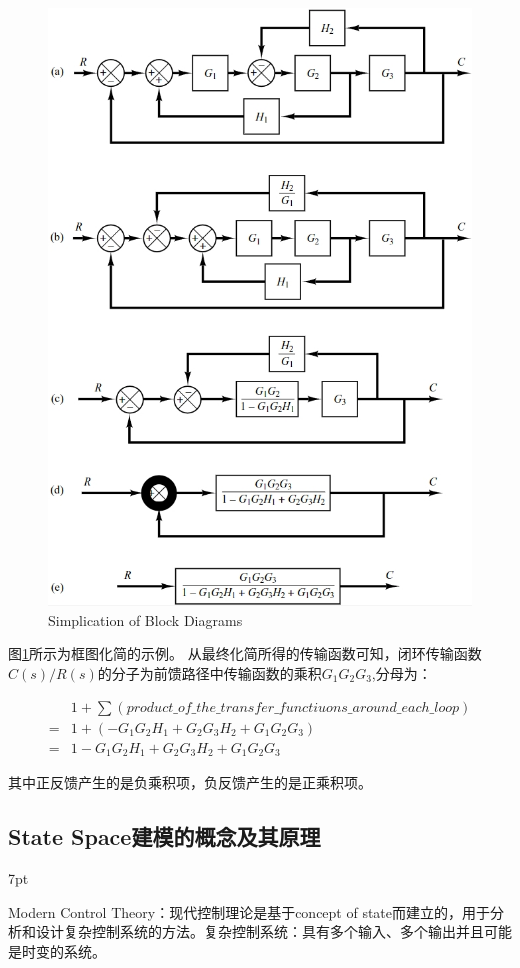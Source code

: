 \documentclass{article}
\numberwithin{equation}{section}
\numberwithin{figure}{section}
\newenvironment{formal}{%
\def\FrameCommand{%
\hspace{1pt}%
{\color{DarkBlue}\vrule width 2pt}%
{\color{formalshade}\vrule width 4pt}%
\colorbox{formalshade}%
}%
\MakeFramed{\advance\hsize-\width\FrameRestore}%
\noindent\hspace{-4.55pt}%
\begin{adjustwidth}{}{7pt}%
\vspace{2pt}\vspace{2pt}%
}
{%
\vspace{2pt}\end{adjustwidth}\endMakeFramed%
}
\begin{document}
\begin{figure}
    \centering
    \includegraphics[width=.6\textwidth]{Chapter2/simplificationofbd.png} %
    \caption{Simplication of Block Diagrams} %
    \label{Simplication of Block Diagrams} %
\end{figure}

图\ref{Simplication of Block Diagrams}所示为框图化简的示例。
从最终化简所得的传输函数可知，闭环传输函数$C(s)/R(s)$的分子为前馈路径中传输函数的乘积$G_1G_2G_3$,分母为：

\begin{equation}
    \begin{split}
        &1+\sum ({product\_of\_the\_transfer\_functiuons\_around\_each\_loop})\\
        =&1+(-G_1G_2H_1+G_2G_3H_2+G_1G_2G_3)\\
        =&1-G_1G_2H_1+G_2G_3H_2+G_1G_2G_3
    \end{split}
\end{equation}

其中正反馈产生的是负乘积项，负反馈产生的是正乘积项。

\subsection{State Space建模的概念及其原理}

\begin{formal}
    Modern Control Theory：现代控制理论是基于concept of state而建立的，用于分析和设计复杂控制系统的方法。复杂控制系统：具有多个输入、多个输出并且可能是时变的系统。
\end{formal}
\end{document}
